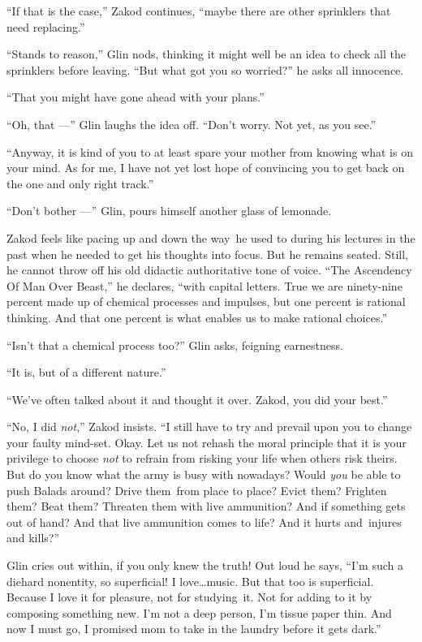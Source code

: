 \documentclass[twoside,11pt]{book}
\begin{document}
{}``If that is the case,'' Zakod continues, ``maybe there are other sprinklers that need replacing.''

``Stands to reason,'' Glin nods, thinking it might well be an idea to check all the sprinklers
before leaving. ``But what got you so worried?'' he asks all innocence.

``That you might have gone ahead with your plans.''

``Oh, that ---'' Glin laughs the idea off. ``Don't worry. Not yet, as you
see.''

``Anyway, it is kind of you to at least spare your mother from knowing what is on your mind. As for me, I
have not yet lost hope of convincing you to get back on the one and only right track.''

``Don't bother ---'' Glin, pours himself another glass of lemonade.

Zakod feels like pacing up and down the way~he used to during his lectures in the past when he needed to get his
thoughts into focus. But he remains seated. Still, he cannot throw off his old didactic authoritative tone of voice.
``The Ascendency Of Man Over Beast,'' he declares, ``with capital letters. True we are
ninety-nine percent made up of chemical processes and impulses, but one percent is rational thinking. And that one
percent is what enables us to make rational choices.''

``Isn't that a chemical process too?'' Glin
asks, feigning earnestness.

``It is, but of a different nature.''

``We've often talked about it and thought it over.  Zakod, you did your best.''

``No, I did \textit{not},'' Zakod insists. ``I still have to try and prevail upon
you to change your faulty mind-set. Okay. Let us not rehash the moral principle that it is your privilege to choose
\textit{not} to refrain from risking your life when others risk theirs. But do you know what the army is busy with
nowadays? Would \textit{you} be able to push Balads around? Drive them~from place to place? Evict them? Frighten them?
Beat them? Threaten them with live ammunition? And if something gets out of hand? And that live ammunition comes to
life? And it hurts and~injures and kills?''

Glin cries out within, if you only knew the truth! Out loud he says, ``I'm such a diehard nonentity, so
superficial! I love{\ldots}music. But that too is superficial. Because I love it for pleasure, not for studying~it. Not
for adding to it by composing something new. I'm not a deep person, I'm tissue paper thin. And now I must go, I
promised mom to take in the laundry before it gets dark.''
\end{document}
